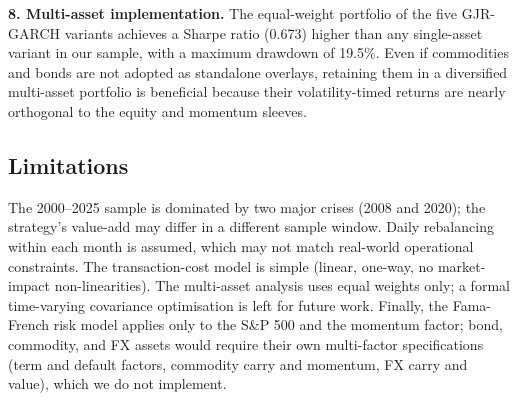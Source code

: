 \documentclass[12pt, a4paper]{article}
\begin{document}
\textbf{8. Multi-asset implementation.} The equal-weight portfolio of the five GJR-GARCH
variants achieves a Sharpe ratio (0.673) higher than any single-asset variant in our sample,
with a maximum drawdown of 19.5\%. Even if commodities and bonds are not adopted as
standalone overlays, retaining them in a diversified multi-asset portfolio is beneficial
because their volatility-timed returns are nearly orthogonal to the equity and momentum
sleeves.

\subsection{Limitations}

The 2000--2025 sample is dominated by two major crises (2008 and 2020); the strategy's
value-add may differ in a different sample window. Daily rebalancing within each month is
assumed, which may not match real-world operational constraints. The transaction-cost model
is simple (linear, one-way, no market-impact non-linearities). The multi-asset analysis uses
equal weights only; a formal time-varying covariance optimisation is left for future work.
Finally, the Fama-French risk model applies only to the S\&P 500 and the momentum factor;
bond, commodity, and FX assets would require their own multi-factor specifications (term
and default factors, commodity carry and momentum, FX carry and value), which we do not
implement.
\end{document}
